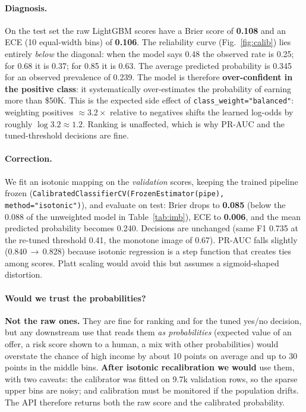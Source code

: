 \documentclass[10.5pt,a4paper]{article}
\newcommand{\code}[1]{\texttt{\small #1}}
\begin{document}
\paragraph{Diagnosis.} On the test set the raw LightGBM scores have a Brier score of \textbf{0.108} and an
ECE (10 equal-width bins) of \textbf{0.106}. The reliability curve (Fig.~\ref{fig:calib}) lies entirely
\emph{below} the diagonal: when the model says 0.48 the observed rate is 0.25; for 0.68 it is 0.37; for 0.85 it
is 0.63. The average predicted probability is 0.345 for an observed prevalence of 0.239. The model is
therefore \textbf{over-confident in the positive class}: it systematically over-estimates the probability
of earning more than \$50K. This is the expected side effect of \code{class\_weight="balanced"}: weighting
positives $\approx3.2\times$ relative to negatives shifts the learned log-odds by roughly $\log 3.2\approx1.2$.
Ranking is unaffected, which is why PR-AUC and the tuned-threshold decisions are fine.

\paragraph{Correction.} We fit an isotonic mapping on the \emph{validation} scores, keeping the trained
pipeline frozen (\code{CalibratedClassifierCV(FrozenEstimator(pipe), method="isotonic")}), and evaluate on
test: Brier drops to \textbf{0.085} (below the 0.088 of the unweighted model in Table~\ref{tab:imb}), ECE to
\textbf{0.006}, and the mean predicted probability becomes 0.240. Decisions are unchanged (same F1 0.735 at
the re-tuned threshold 0.41, the monotone image of 0.67). PR-AUC falls slightly (0.840\,$\rightarrow$\,0.828)
because isotonic regression is a step function that creates ties among scores. Platt scaling would avoid
this but assumes a sigmoid-shaped distortion.

\paragraph{Would we trust the probabilities?} \textbf{Not the raw ones.} They are fine for ranking and for the
tuned yes/no decision, but any downstream use that reads them \emph{as probabilities} (expected value of an
offer, a risk score shown to a human, a mix with other probabilities) would overstate the chance of high
income by about 10 points on average and up to 30 points in the middle bins. \textbf{After isotonic
recalibration we would} use them, with two caveats: the calibrator was fitted on 9.7k validation rows, so the
sparse upper bins are noisy; and calibration must be monitored if the population drifts. The API therefore
returns both the raw score and the calibrated probability.
\end{document}
